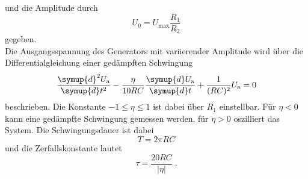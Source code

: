 und die Amplitude durch 
\begin{equation}
    U_0 = U_\text{max} \frac{R_1}{R_2}
    \label{eq:amplitude_generator}
\end{equation}
gegeben. \\
Die Ausgangsspannung des Generators mit variierender Amplitude wird über die Differentialgleichung einer gedämpften Schwingung
\begin{equation}
    \frac{\symup{d}^2 U_\text{a}}{\symup{d}t^2} - \frac{\eta}{10RC}\frac{\symup{d}U_\text{a}}{\symup{d}t} + \frac{1}{(RC)^2}U_\text{a} = 0
\end{equation}
beschrieben. Die Konstante $-1 \leq \eta \leq 1$ ist dabei über $R_1$ einstellbar. 
Für $\eta < 0$ kann eine gedämpfte Schwingung gemessen werden, für $\eta > 0$ oszilliert das System.
Die Schwingungsdauer ist dabei 
\begin{equation}
    T = 2 \pi RC 
    \label{eq:T}
\end{equation}
und die Zerfallskonstante lautet
\begin{equation}
    \tau = \frac{20 RC}{|\eta|} \; .
\end{equation}
